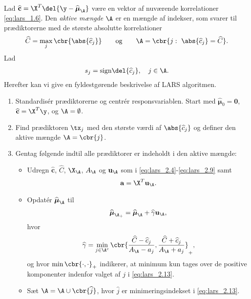 Lad \(\widehat{\mathbf{c}} = \X^T \del{\y - \widehat{\boldsymbol{\mu}}_\A}\) være en vektor af nuværende korrelationer \eqref{eq:lars_1.6}.
Den \textit{aktive mængde} \(\A\) er en mængde af indekser, som svarer til prædiktorerne med de største absolutte korrelationer
\begin{align}
\widehat{C} = \max_j \cbr{\abs{\widehat{c}_j}}  \qquad \text{og} \qquad \A= \cbr{j: \ \abs{ \widehat{c}_j} = \widehat{C}}. \label{eq:lars_2.9}
\end{align}
Lad 
\begin{align}
s_j = \text{sign} \del{\widehat{c}_j}, \quad j \in \A. \label{eq:lars_2.10}
\end{align}
%
Herefter kan vi give en fyldestgørende beskrivelse af LARS algoritmen.
%
\begin{alg} 
\begin{enumerate}
\item Standardisér prædiktorerne og centrér responsvariablen. 
Start med \(\widehat{\boldsymbol{\mu}}_0 = \mathbf{0}\), \(\widehat{\mathbf{c}} = \X^T \y\), og \(\A = \emptyset\).
\item Find prædiktoren \(\tx_j\) med den største værdi af \(\abs{\widehat{c}_j}\) og definer den aktive mængde \(\A = \cbr{j}\).
\item 
Gentag følgende indtil alle prædiktorer er indeholdt i den aktive mængde:
\begin{itemize}
\item Udregn \(\widehat{\mathbf{c}}\), \(\widehat{C}\), \(\X_\A\), \(A_\A\) og \(\mathbf{u}_\A\) som i \eqref{eq:lars_2.4}-\ref{eq:lars_2.9} samt
\begin{align*}
\mathbf{a} = \X^T \mathbf{u}_\A.
\end{align*}
\item Opdatér \(\widehat{\boldsymbol{\mu}}_\A\) til
\begin{align}
\widehat{\boldsymbol{\mu}}_{\A_+} = \widehat{\boldsymbol{\mu}}_\A + \widehat{\gamma} \mathbf{u}_\A, \label{eq:lars_2.12}
\end{align}
hvor 
\begin{align}
\widehat{\gamma} = \min_{j \in \A^c} \cbr{ \frac{\widehat{C}- \widehat{c}_j}{A_\A - a_j} , \frac{\widehat{C} + \widehat{c}_j}{A_\A + a_j}}_+, \label{eq:lars_2.13}
\end{align}
og hvor \(\min \cbr{\cdot , \cdot}_+\) indikerer, at minimum kun tages over de positive komponenter indenfor valget af \(j\) i \eqref{eq:lars_2.13}.
\item Sæt \(\A = \A \cup \cbr{\widehat{j}}\), hvor \(\widehat{j}\) er minimeringsindekset i \eqref{eq:lars_2.13}.
\end{itemize}
\end{enumerate}
\end{alg}

